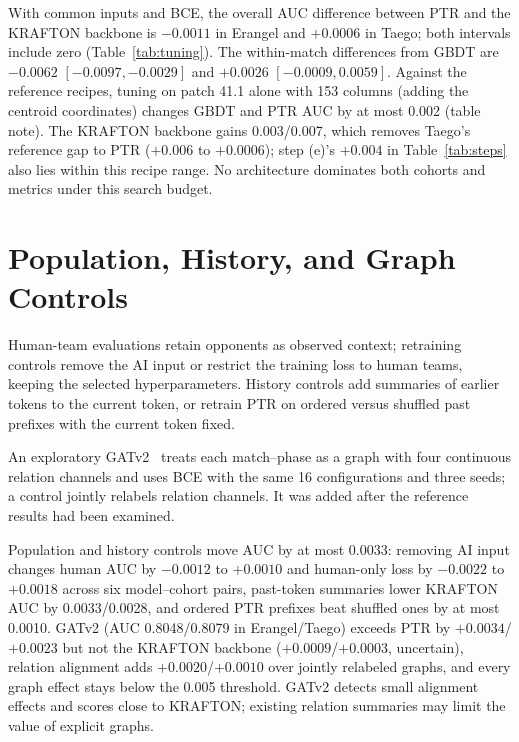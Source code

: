 \documentclass[sigconf,anonymous,nonacm]{acmart}
\begin{document}
With common inputs and BCE, the overall AUC difference between PTR and the KRAFTON backbone is $-0.0011$ in Erangel and $+0.0006$ in Taego; both intervals include zero (Table~\ref{tab:tuning}). The within-match differences from GBDT are $-0.0062$ $[-0.0097,\allowbreak -0.0029]$ and $+0.0026$ $[-0.0009,\allowbreak 0.0059]$. Against the reference recipes, tuning on patch 41.1 alone with 153 columns (adding the centroid coordinates) changes GBDT and PTR AUC by at most 0.002 (table note). The KRAFTON backbone gains 0.003/0.007, which removes Taego's reference gap to PTR ($+0.006$ to $+0.0006$); step (e)'s $+0.004$ in Table~\ref{tab:steps} also lies within this recipe range. No architecture dominates both cohorts and metrics under this search budget.

\section{Population, History, and Graph Controls}
Human-team evaluations retain opponents as observed context; retraining controls remove the AI input or restrict the training loss to human teams, keeping the selected hyperparameters. History controls add summaries of earlier tokens to the current token, or retrain PTR on ordered versus shuffled past prefixes with the current token fixed.

An exploratory GATv2~\cite{Brody22} treats each match--phase as a graph with four continuous relation channels and uses BCE with the same 16 configurations and three seeds; a control jointly relabels relation channels. It was added after the reference results had been examined.

Population and history controls move AUC by at most 0.0033: removing AI input changes human AUC by $-0.0012$ to $+0.0010$ and human-only loss by $-0.0022$ to $+0.0018$ across six model--cohort pairs, past-token summaries lower KRAFTON AUC by 0.0033/0.0028, and ordered PTR prefixes beat shuffled ones by at most 0.0010. GATv2 (AUC 0.8048/0.8079 in Erangel/Taego) exceeds PTR by $+0.0034$/$+0.0023$ but not the KRAFTON backbone ($+0.0009$/$+0.0003$, uncertain), relation alignment adds $+0.0020$/$+0.0010$ over jointly relabeled graphs, and every graph effect stays below the 0.005 threshold. GATv2 detects small alignment effects and scores close to KRAFTON; existing relation summaries may limit the value of explicit graphs.



\end{document}
